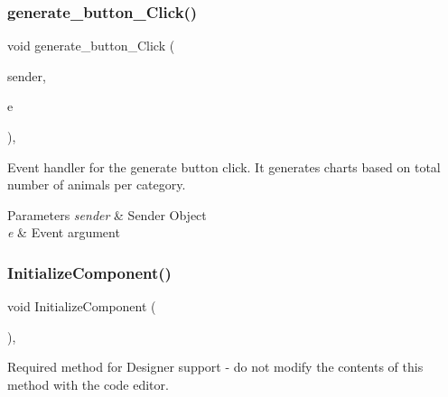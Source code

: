 \subsubsection{\texorpdfstring{generate\+\_\+button\+\_\+\+Click()}{generate\_button\_Click()}}
{\footnotesize\ttfamily void generate\+\_\+button\+\_\+\+Click (\begin{DoxyParamCaption}\item[{object}]{sender,  }\item[{Event\+Args}]{e }\end{DoxyParamCaption})\hspace{0.3cm}{\ttfamily [inline]}, {\ttfamily [private]}}



Event handler for the generate button click. It generates charts based on total number of animals per category. 


\begin{DoxyParams}{Parameters}
{\em sender} & Sender Object\\
\hline
{\em e} & Event argument\\
\hline
\end{DoxyParams}
\mbox{\label{classWildlifeTrackingApp_1_1Report_a6405d5db675d5338663195a4d12b4c9f}} 
\subsubsection{\texorpdfstring{Initialize\+Component()}{InitializeComponent()}}
{\footnotesize\ttfamily void Initialize\+Component (\begin{DoxyParamCaption}{ }\end{DoxyParamCaption})\hspace{0.3cm}{\ttfamily [inline]}, {\ttfamily [private]}}



Required method for Designer support -\/ do not modify the contents of this method with the code editor. 

\mbox{\label{classWildlifeTrackingApp_1_1Report_a689e29ad27d8dabef272ce565669e8d9}} 
